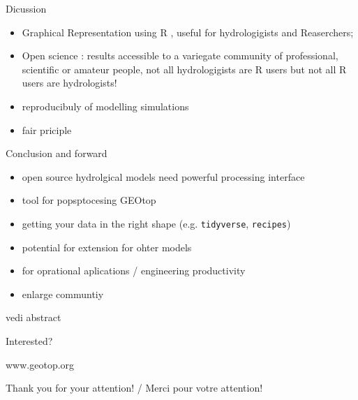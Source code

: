 \documentclass[ignorenonframetext,]{beamer}
\providecommand{\tightlist}{%
  \setlength{\itemsep}{0pt}\setlength{\parskip}{0pt}}
\begin{document}
\begin{frame}{Dicussion}

\begin{itemize}
\tightlist
\item
  Graphical Representation using R , useful for hydrologigists and
  Reaserchers;
\item
  Open science : results accessible to a variegate community of
  professional, scientific or amateur people, not all hydrologigists are
  R users but not all R users are hydrologists!
\item
  reproducibuly of modelling simulations
\item
  fair priciple
\end{itemize}

\end{frame}

\begin{frame}[fragile]{Conclusion and forward}

\begin{itemize}
\item
  open source hydrolgical models need powerful processing interface
\item
  tool for popsptocesing GEOtop
\item
  getting your data in the right shape (e.g. \texttt{tidyverse},
  \texttt{recipes})
\item
  potential for extension for ohter models
\item
  for oprational aplications / engineering productivity
\item
  enlarge communtiy
\end{itemize}

vedi abstract

\end{frame}

\begin{frame}{Interested?}

www.geotop.org

Thank you for your attention! / Merci pour votre attention!

\end{frame}
\end{document}
